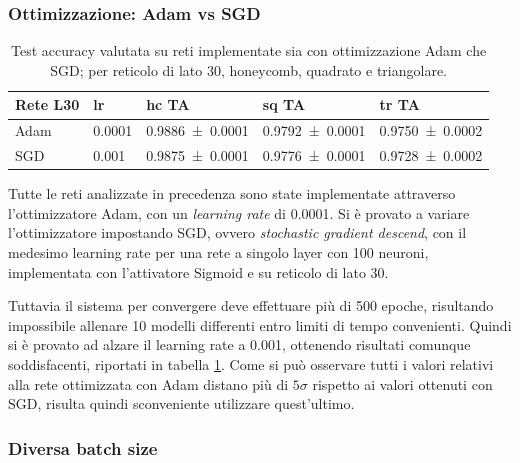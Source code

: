 \documentclass{article}
\begin{document}
\subsubsection{Ottimizzazione: Adam vs SGD}

\begin{table}[!ht]
\begin{center}
\begin{tabular}{lllll}
\toprule
Rete L30& lr & hc TA & sq TA & tr TA \\
\midrule
Adam &0.0001& \num{0.9886\pm 0.0001} & \num{0.9792\pm 0.0001} & \num{0.9750\pm 0.0002}\\
SGD & 0.001 & \num{0.9875\pm 0.0001} & \num{0.9776 \pm 0.0001} &\num{ 0.9728\pm 0.0002}\\
\bottomrule
\end{tabular}
\end{center}
\caption{Test accuracy valutata su reti implementate sia con ottimizzazione Adam che SGD; per reticolo di lato 30, honeycomb, quadrato e triangolare.}
\label{tab:adaVSsgd}
\end{table}

Tutte le reti analizzate in precedenza sono state implementate attraverso l'ottimizzatore Adam, con un \emph{learning rate} di 0.0001.
Si è provato a variare l'ottimizzatore impostando SGD, ovvero \emph{stochastic gradient descend}, con il medesimo learning rate per una rete a singolo layer con 100 neuroni, implementata con l'attivatore Sigmoid e su reticolo di lato 30.

Tuttavia il sistema per convergere deve effettuare più di 500 epoche, risultando impossibile allenare 10 modelli differenti entro limiti di tempo convenienti.
Quindi si è provato ad alzare il learning rate a 0.001, ottenendo risultati comunque soddisfacenti, riportati in tabella \ref{tab:adaVSsgd}.
Come si può osservare tutti i valori relativi alla rete ottimizzata con Adam distano più di $5\sigma$ rispetto ai valori ottenuti con SGD, risulta quindi sconveniente utilizzare quest'ultimo.

\subsubsection{Diversa batch size}
\end{document}
